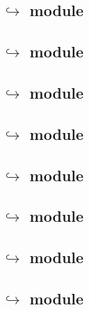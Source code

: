 \subsection{\txnDataMod{} $\hookrightarrow$ \wcpMod        {} module \lispDone{}}   \label{user txn data: lookups: wcp}            
\subsection{\txnDataMod{} $\hookrightarrow$ \eucMod        {} module \lispDone{}}   \label{user txn data: lookups: euc}            
\subsection{\txnDataMod{} $\hookrightarrow$ \rlpTxnMod     {} module \lispDone{}}   \label{user txn data: lookups: txn rlp}        
\subsection{\txnDataMod{} $\hookrightarrow$ \romLexMod     {} module \lispDone{}}   \label{user txn data: lookups: rom lex}        
\subsection{\txnDataMod{} $\hookrightarrow$ \rlpAddrMod    {} module \lispDone{}}   \label{user txn data: lookups: addr rlp}       
\subsection{\txnDataMod{} $\hookrightarrow$ \btcMod        {} module \lispDone{}}   \label{user txn data: lookups: block data}     
\subsection{\txnDataMod{} $\hookrightarrow$ \rlpTxnRcptMod {} module }   \label{user txn data: lookups: rlp txnrcpt}     %
\subsection{\txnDataMod{} $\hookrightarrow$ \hubMod        {} module \lispDone{}}   \label{user txn data: lookups: into the hub}   
